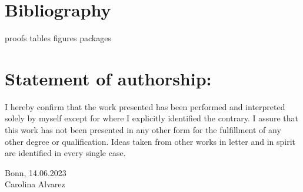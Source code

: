 \documentclass[12pt, a4paper]{article} %
\theoremstyle{MAstyle} \newtheorem{assumption}{Assumption}[section]
\theoremstyle{MAstyle} \newtheorem{definition}{Definition}[section]
\theoremstyle{MAstyle} \newtheorem{theorem}{Theorem}[section]
\theoremstyle{MAstyle} \newtheorem{lemma}{Lemma}[]
\begin{document}
	

	\newpage
	\section{Bibliography}
	\printbibliography[heading=none]
	
	\newpage


	\newpage
	\cleardoublepage
	\setcounter{page}{1}
	{proofs}
        {tables}
        {figures}
        {packages}
		
	\newpage
	\thispagestyle{empty}
	\section*{Statement of authorship:}	
	
		\vspace{3cm}
		
		I hereby confirm that the work presented has been performed and interpreted solely by myself except for where I explicitly identified the contrary. I assure that this work has not been presented in any other form for the fulfillment of any other degree or qualification. Ideas taken from other works in letter and in spirit are identified in every single case.
		
		\vspace{2cm}
		Bonn, 14.06.2023 \hrulefill \\
		\hspace*{0mm}Carolina Alvarez
		
		\vspace{\fill}
\end{document}

